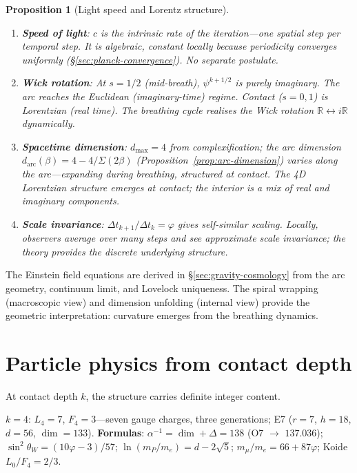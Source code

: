 \documentclass[12pt,a4paper]{article}
\newtheorem{proposition}[theorem]{Proposition}
\begin{document}
\begin{proposition}[Light speed and Lorentz structure]
\label{prop:relativity}
\begin{enumerate}[nosep]
\item \textbf{Speed of light}: $c$ is the intrinsic rate of the iteration---one spatial step per temporal step. It is algebraic, constant locally because periodicity converges uniformly (\S\ref{sec:planck-convergence}). No separate postulate.
\item \textbf{Wick rotation}: At $s = 1/2$ (mid-breath), $\psi^{k+1/2}$ is purely imaginary. The arc reaches the Euclidean (imaginary-time) regime. Contact ($s = 0, 1$) is Lorentzian (real time). The breathing cycle realises the Wick rotation $\mathbb{R} \leftrightarrow i\mathbb{R}$ dynamically.
\item \textbf{Spacetime dimension}: $d_{\max} = 4$ from complexification; the arc dimension $d_{\mathrm{arc}}(\beta) = 4 - 4/\Sigma(2\beta)$ (Proposition~\ref{prop:arc-dimension}) varies along the arc---expanding during breathing, structured at contact. The 4D Lorentzian structure emerges at contact; the interior is a mix of real and imaginary components.
\item \textbf{Scale invariance}: $\Delta t_{k+1}/\Delta t_k = \varphi$ gives self-similar scaling. Locally, observers average over many steps and see approximate scale invariance; the theory provides the discrete underlying structure.
\end{enumerate}
\end{proposition}

\noindent The Einstein field equations are derived in \S\ref{sec:gravity-cosmology} from the arc geometry, continuum limit, and Lovelock uniqueness. The spiral wrapping (macroscopic view) and dimension unfolding (internal view) provide the geometric interpretation: curvature emerges from the breathing dynamics.

\section{Particle physics from contact depth}
\label{sec:particle}
\label{sec:trunk-gauge}

At contact depth $k$, the structure carries definite integer content.

\textbf{$k = 4$}: $L_4 = 7$, $F_4 = 3$---seven gauge charges, three generations; E7 ($r=7$, $h=18$, $d=56$, $\dim=133$). \textbf{Formulas}: $\alpha^{-1} = \dim + \Delta = 138$ (O7 $\to$ $137.036$); $\sin^2\theta_W = (10\varphi-3)/57$; $\ln(m_P/m_e) = d - 2\sqrt{5}$; $m_\mu/m_e = 66 + 87\varphi$; Koide $L_0/F_4 = 2/3$.
\end{document}

